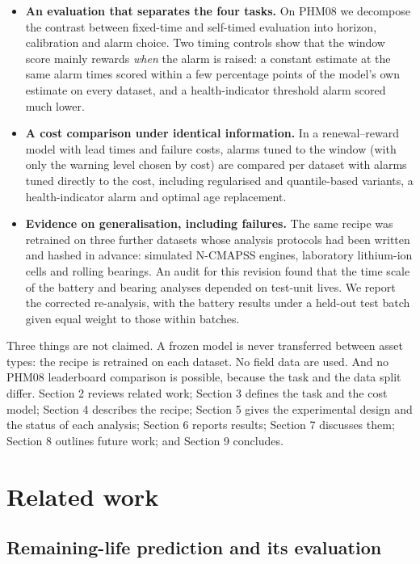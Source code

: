 \documentclass[a4paper,fleqn,doubleblind]{cas-dc}
\begin{document}
\begin{itemize}[leftmargin=1.2em,itemsep=2pt]
\item[(i)] \textbf{An evaluation that separates the four tasks.} On PHM08 we decompose the contrast between fixed-time and self-timed evaluation into horizon, calibration and alarm choice. Two timing controls show that the window score mainly rewards \textit{when} the alarm is raised: a constant estimate at the same alarm times scored within a few percentage points of the model's own estimate on every dataset, and a health-indicator threshold alarm scored much lower.
\item[(ii)] \textbf{A cost comparison under identical information.} In a renewal--reward model with lead times and failure costs, alarms tuned to the window (with only the warning level chosen by cost) are compared per dataset with alarms tuned directly to the cost, including regularised and quantile-based variants, a health-indicator alarm and optimal age replacement.
\item[(iii)] \textbf{Evidence on generalisation, including failures.} The same recipe was retrained on three further datasets whose analysis protocols had been written and hashed in advance: simulated N-CMAPSS engines, laboratory lithium-ion cells and rolling bearings. An audit for this revision found that the time scale of the battery and bearing analyses depended on test-unit lives. We report the corrected re-analysis, with the battery results under a held-out test batch given equal weight to those within batches.
\end{itemize}

Three things are not claimed. A frozen model is never transferred between asset types: the recipe is retrained on each dataset. No field data are used. And no PHM08 leaderboard comparison is possible, because the task and the data split differ. Section 2 reviews related work; Section 3 defines the task and the cost model; Section 4 describes the recipe; Section 5 gives the experimental design and the status of each analysis; Section 6 reports results; Section 7 discusses them; Section 8 outlines future work; and Section 9 concludes.

\section{Related work}\label{sec:2}

\subsection{Remaining-life prediction and its evaluation}
\end{document}
